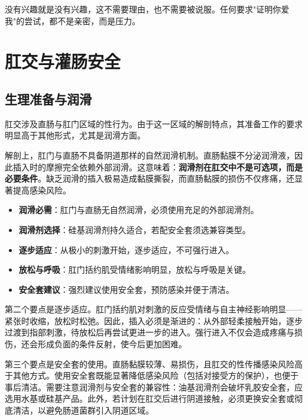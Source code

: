 \documentclass[12pt,UTF8]{ctexbook}
\newcommand{\keyword}[1]{\textbf{#1}}
\begin{document}
\begin{tcolorbox}[colback=pink!5!white,colframe=red!50!black,title=贴心小叮咛]
	没有兴趣就是没有兴趣，这不需要理由，也不需要被说服。任何要求"证明你爱我"的尝试，都不是亲密，而是压力。
\end{tcolorbox}

\section{肛交与灌肠安全}
\subsection{生理准备与润滑}

肛交涉及直肠与肛门区域的性行为。由于这一区域的解剖特点，其准备工作的要求明显高于其他形式，尤其是润滑方面。

解剖上，肛门与直肠不具备阴道那样的自然润滑机制。直肠黏膜不分泌润滑液，因此插入时的摩擦完全依赖外部润滑。这意味着：\keyword{润滑剂在肛交中不是可选项，而是必要条件}。缺乏润滑的插入极易造成黏膜撕裂，而直肠黏膜的损伤不仅疼痛，还显著提高感染风险。

\begin{itemize}
	\item \keyword{润滑必需}：肛门与直肠无自然润滑，必须使用充足的外部润滑剂。
	\item \keyword{润滑剂选择}：硅基润滑剂持久适合，若配安全套须选兼容类型。
	\item \keyword{逐步适应}：从极小的刺激开始，逐步适应，不可强行进入。
	\item \keyword{放松与呼吸}：肛门括约肌受情绪影响明显，放松与呼吸是关键。
	\item \keyword{安全套建议}：强烈建议使用安全套，预防感染并便于清洁。
\end{itemize}

第二个要点是逐步适应。肛门括约肌对刺激的反应受情绪与自主神经影响明显——紧张时收缩，放松时松弛。因此，插入必须是渐进的：从外部轻柔接触开始，逐步过渡到指部刺激，待放松后再尝试更进一步的进入。强行进入不仅会造成疼痛与损伤，还会形成负面的条件反射，使今后更加困难。

第三个要点是安全套的使用。直肠黏膜较薄、易损伤，且肛交的性传播感染风险高于其他方式。使用安全套既能显著降低感染风险（包括对接受方的保护），也便于事后清洁。需要注意润滑剂与安全套的兼容性：油基润滑剂会破坏乳胶安全套，应选用水基或硅基产品。此外，若计划在肛交后进行阴道接触，必须更换安全套或彻底清洁，以避免肠道菌群引入阴道区域。
\end{document}
